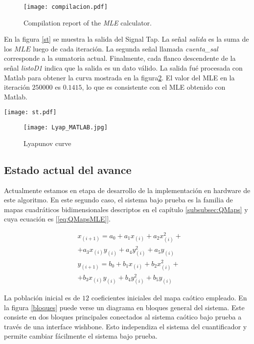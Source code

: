 \begin{figure}
	\centering
	\texttt{[image: compilacion.pdf]}\\
	\caption{Compilation report of the \textit{MLE} calculator.}\label{compilacion}
\end{figure}

En la figura \ref{st} se muestra la salida del Signal Tap.
La señal \textit{salida} es la suma de los $MLE$ luego de cada iteración.
La segunda señal llamada \textit{cuenta\_sal} corresponde a la sumatoria actual.
Finalmente, cada flanco descendente de la señal \textit{listoD1} indica que la salida es un dato válido.
La salida fué procesada con Matlab para obtener la curva mostrada en la figura\ref{lyapu}.
El valor del MLE en la iteración $250000$ es $0.1415$, lo que es consistente con el MLE obtenido con Matlab.

\begin{figure*}
	\centering
	\texttt{[image: st.pdf]}\\
	\caption{Signal Tap output.}\label{st}
\end{figure*}

\begin{figure}
	\centering
	\texttt{[image: Lyap\_MATLAB.jpg]}\\
	\caption{Lyapunov curve}\label{lyapu}
\end{figure}


\subsection{Estado actual del avance}

Actualmente estamos en etapa de desarrollo de la implementación en hardware de este algoritmo.
En este segundo caso, el sistema bajo prueba es la familia de mapas cuadráticos bidimensionales descriptos en el capítulo \ref{subsubsec:QMaps} y cuya ecuación es \ref{[eq:QMapsMLE]}.

\begin{eqnarray}\label{eq:QMapsMLE}
&x_{(i+1)}=a_0 + a_1 x_{(i)} + a_2 x_{(i)}^2 +\\ \nonumber
&+ a_3 x_{(i)} y_{(i)} + a_4 y_{(i)}^2 + a_5 y_{(i)}\\ \nonumber
&y_{(i+1)}=b_0 + b_1 x_{(i)} + b_2 x_{(i)}^2 +\\ \nonumber
&+ b_3 x_{(i)} y_{(i)} + b_4 y_{(i)}^2 + b_5 y_{(i)}\nonumber
\end{eqnarray}

La población inicial es de $12$ coeficientes iniciales del mapa caótico empleado.
En la figura \ref{bloques} puede verse un diagrama en bloques general del sistema.
Este consiste en dos bloques principales conectados al sistema caótico bajo prueba a través de una interface wishbone.
Esto independiza el sistema del cuantificador y permite cambiar fácilmente el sistema bajo prueba.

